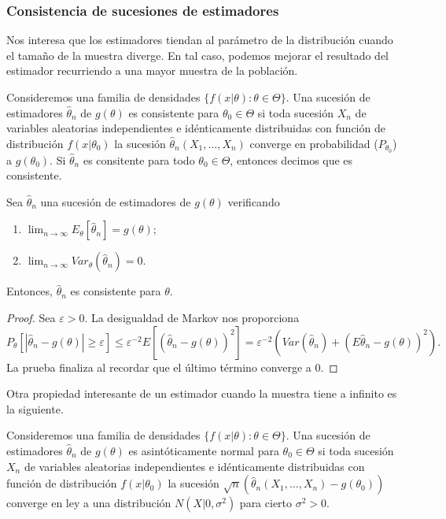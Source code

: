     \subsubsection{Consistencia de sucesiones de estimadores}

    Nos interesa que los estimadores tiendan al parámetro de la distribución cuando el tamaño de la muestra diverge. En tal caso, podemos mejorar el resultado del estimador recurriendo a una mayor muestra de la población.

    \begin{definition}
        Consideremos una familia de densidades $\{f(x | \theta) : \theta \in \Theta\}$. Una sucesión de estimadores $\hat\theta_n$ de $g(\theta)$ es consistente para $\theta_0 \in \Theta$ si toda sucesión $X_n$ de variables aleatorias independientes e idénticamente distribuidas con función de distribución $f(x | \theta_0)$ la sucesión $\hat\theta_n(X_1, \ldots, X_n)$ converge en probabilidad ($P_{\theta_0}$) a $g(\theta_0)$. Si $\hat\theta_n$ es consitente para todo $\theta_0 \in \Theta$, entonces decimos que es consistente.
    \end{definition}

    \begin{thm}
        Sea $\hat\theta_n$ una sucesión de estimadores de $g(\theta)$ verificando
        \begin{enumerate}
            \item $\lim_{n \to \infty} E_\theta[\hat\theta_n] = g(\theta)$;
            \item $\lim_{n \to \infty} Var_\theta(\hat\theta_n) = 0$.
        \end{enumerate}
        Entonces, $\hat\theta_n$ es consistente para $\theta$.
    \end{thm}
    \begin{proof}
        Sea $\varepsilon > 0$. La desigualdad de Markov nos proporciona
        \[P_\theta[|\hat\theta_n - g(\theta)| \ge \varepsilon] \le \varepsilon^{-2} E[(\hat\theta_n - g(\theta))^2] = \varepsilon^{-2}  \left(Var(\hat\theta_n) + (E\hat\theta_n -g(\theta))^2\right).\]
        La prueba finaliza al recordar que el último término converge a $0$.
    \end{proof}

    Otra propiedad interesante de un estimador cuando la muestra tiene a infinito es la siguiente.

    \begin{definition}
        Consideremos una familia de densidades $\{f(x | \theta) : \theta \in \Theta\}$. Una sucesión de estimadores $\hat\theta_n$ de $g(\theta)$ es asintóticamente normal para $\theta_0 \in \Theta$ si toda sucesión $X_n$ de variables aleatorias independientes e idénticamente distribuidas con función de distribución $f(x | \theta_0)$ la sucesión $\sqrt{n}(\hat\theta_n(X_1, \ldots, X_n) - g(\theta_0))$ converge en ley a una distribución $N(X|0,\sigma^2)$ para cierto $\sigma^2 > 0$.
    \end{definition}

